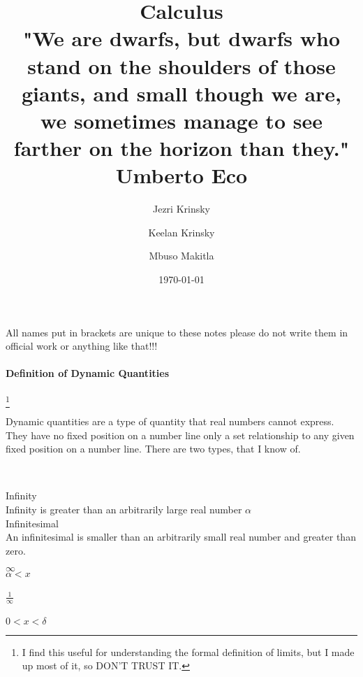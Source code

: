 \documentclass[12pt, a4paper,oneside]{book}
\begin{document}
                                              
	 \title{ Calculus  \\
 \normalsize  "We are dwarfs, but dwarfs who stand on the shoulders of those giants, and small though we are, we sometimes manage to see farther on 				the horizon than they." \\ \normalsize Umberto Eco } 
    \date{\today} 
	
    \author{Jezri Krinsky \and Keelan Krinsky 
    	\and Mbuso Makitla}                                               
	
    \maketitle
		{\huge All names put in brackets are unique to these notes please do not write them in official work or anything like that!!!}
    
    \tableofcontents
        \paragraph{Definition of Dynamic Quantities} 
           
           \footnote{I find this useful for understanding the formal definition of 										limits, but I made up most of it, so DON'T TRUST IT.}

			\begin{paragraph} Dynamic quantities are a type of quantity that real numbers 								cannot express. They have no fixed position on a number line only a set 								relationship to any given fixed position on a number line. There are two 								types, that I know of.
			\end{paragraph}
	
    		\begin{paracol}{2}\
				\begin{leftcolumn}
					Infinity
						\\ Infinity is greater than an arbitrarily large real number $\alpha $ \\ 					Infinitesimal \\
						An infinitesimal is smaller than an arbitrarily small real number and 							greater than zero. 
				\end{leftcolumn}

				\begin{rightcolumn}
					$ \infty$ \\ $\alpha < x$ \\ \\ $\frac{1}{\infty}$ \\ \\ $0<x<\delta$
					\end{rightcolumn}
			\end{paracol}
\end{document}
